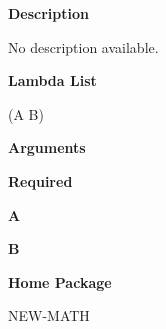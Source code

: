  
{\bf Description}

No description available.

 
{\bf Lambda List}

(A B)

 
{\bf Arguments}


\beginhang
{\bf Required}\hspace{2em}
 
{\bf A}


 
{\bf B}


 
\endhang
 
{\bf Home Package}

NEW-MATH

